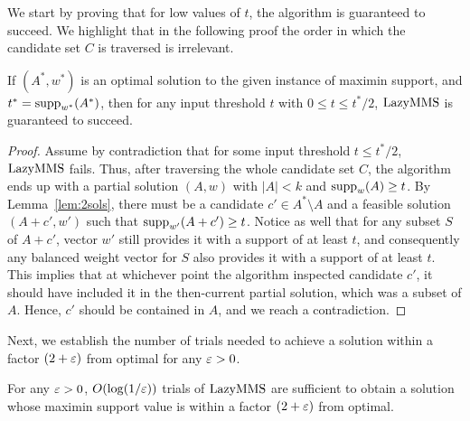 We start by proving that for low values of $t$, the algorithm is guaranteed to succeed. 
We highlight that in the following proof the order in which the candidate set $C$ is traversed is irrelevant. 

\begin{lemma}\label{lem:success}
If $(A^*, w^*)$ is an optimal solution to the given instance of maximin support, and $t^*=\operatorname{supp}_{w^*}(A^*)$, then for any input threshold $t$ with $0\leq t\leq t^*/2$, $\operatorname{LazyMMS}$ is guaranteed to succeed.
\end{lemma}

\begin{proof}
Assume by contradiction that for some input threshold $t\leq t^*/2$, $\operatorname{LazyMMS}$ fails. 
Thus, after traversing the whole candidate set $C$, the algorithm ends up with a partial solution $(A,w)$ with $|A|<k$ and $\operatorname{supp}_w(A)\geq t$. 
By Lemma~\ref{lem:2sols}, there must be a candidate $c'\in A^*\setminus A$ and a feasible solution $(A+c', w')$ such that $\operatorname{supp}_{w'}(A+c')\geq t$. 
Notice as well that for any subset $S$ of $A+c'$, vector $w'$ still provides it with a support of at least $t$, and consequently any balanced weight vector for $S$ also provides it with a support of at least $t$. 
This implies that at whichever point the algorithm inspected candidate $c'$, it should have included it in the then-current partial solution, which was a subset of $A$. Hence, $c'$ should be contained in $A$, and we reach a contradiction.
\end{proof}

Next, we establish the number of trials needed to achieve a solution within a factor $(2+\varepsilon)$ from optimal for any $\varepsilon>0$. 

\begin{lemma}\label{lem:lazybinary}
For any $\varepsilon>0$, $O(\log(1/\varepsilon))$ trials of $\operatorname{LazyMMS}$ are sufficient to obtain a solution whose maximin support value is within a factor $(2+\varepsilon)$ from optimal.
\end{lemma}

